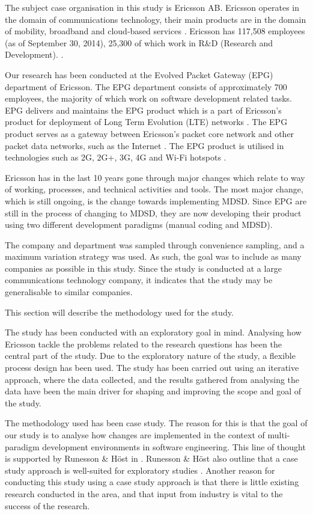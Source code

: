 \documentclass[10pt,twocolumn]{article}
\begin{document}
The subject case organisation in this study is Ericsson AB. Ericsson operates in the domain of communications technology, their main products are in the domain of mobility, broadband and cloud-based services \cite{a7} \cite{a8}. Ericsson has 117,508 employees (as of September 30, 2014), 25,300 of which work in R\&D (Research and Development). \cite{a7}. 

Our research has been conducted at the Evolved Packet Gateway (EPG) department of Ericsson. The EPG department consists of approximately 700 employees, the majority of which work on software development related tasks. EPG delivers and maintains the EPG product which is a part of Ericsson's product for deployment of Long Term Evolution (LTE) networks \cite{a9}. The EPG product serves as a gateway between Ericsson's packet core network and other packet data networks, such as the Internet \cite{a9}. The EPG product is utilised in technologies such as 2G, 2G+, 3G, 4G and Wi-Fi hotspots \cite{a9}. 

Ericsson has in the last 10 years gone through major changes which relate to way of working, processes, and technical activities and tools. The most major change, which is still ongoing, is the change towards implementing MDSD. Since EPG are still in the process of changing to MDSD, they are now developing their product using two different development paradigms (manual coding and MDSD). 

The company and department was sampled through convenience sampling, and a maximum variation strategy was used. As such, the goal was to include as many companies as possible in this study. Since the study is conducted at a large communications technology company, it indicates that the study may be generalisable to similar companies.

This section will describe the methodology used for the study. 

The study has been conducted with an exploratory goal in mind. Analysing how Ericsson tackle the problems related to the research questions has been the central part of the study. Due to the exploratory nature of the study, a flexible process design has been used. The study has been carried out using an iterative approach, where the data collected, and the results gathered from analysing the data have been the main driver for shaping and improving the scope and goal of the study. 

The methodology used has been case study. The reason for this is that the goal of our study is to analyse how changes are implemented in the context of multi-paradigm development environments in software engineering. This line of thought is supported by Runesson \& H\"{o}st in \cite{runeson2009guidelines}. Runesson \& H\"{o}st also outline that a case study approach is well-suited for exploratory studies \cite{runeson2009guidelines}. Another reason for conducting this study using a case study approach is that there is little existing research conducted in the area, and that input from industry is vital to the success of the research. 
\end{document}
